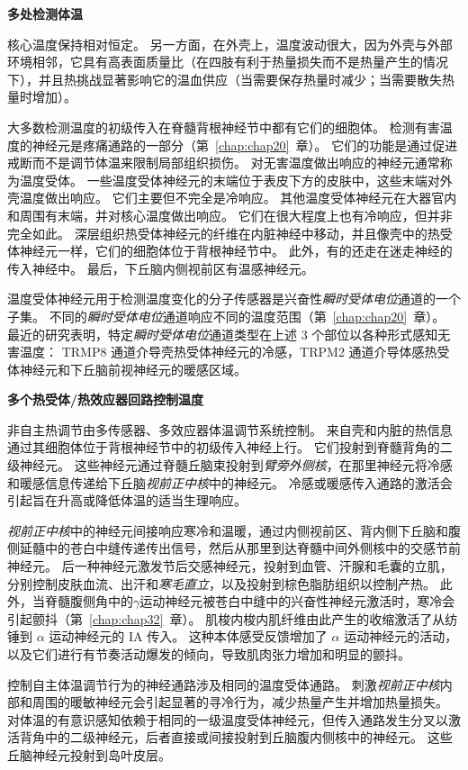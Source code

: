 \textbf{多处检测体温}

核心温度保持相对恒定。
另一方面，在外壳上，温度波动很大，因为外壳与外部环境相邻，它具有高表面质量比（在四肢有利于热量损失而不是热量产生的情况下），并且热挑战显著影响它的温血供应（当需要保存热量时减少；当需要散失热量时增加）。


大多数检测温度的初级传入在脊髓背根神经节中都有它们的细胞体。
检测有害温度的神经元是疼痛通路的一部分（第~\ref{chap:chap20}~章）。
它们的功能是通过促进戒断而不是调节体温来限制局部组织损伤。
对无害温度做出响应的神经元通常称为温度受体。
一些温度受体神经元的末端位于表皮下方的皮肤中，这些末端对外壳温度做出响应。
它们主要但不完全是冷响应。
其他温度受体神经元在大器官内和周围有末端，并对核心温度做出响应。
它们在很大程度上也有冷响应，但并非完全如此。
深层组织热受体神经元的纤维在内脏神经中移动，并且像壳中的热受体神经元一样，它们的细胞体位于背根神经节中。
此外，有的还走在迷走神经的传入神经中。
最后，下丘脑内侧视前区有温感神经元。


温度受体神经元用于检测温度变化的分子传感器是兴奋性\textit{瞬时受体电位}通道的一个子集。
不同的\textit{瞬时受体电位}通道响应不同的温度范围（第~\ref{chap:chap20}~章）。
最近的研究表明，特定\textit{瞬时受体电位}通道类型在上述 3 个部位以各种形式感知无害温度：
TRMP8 通道介导壳热受体神经元的冷感，TRPM2 通道介导体感热受体神经元和下丘脑前视神经元的暖感区域。


\textbf{多个热受体/热效应器回路控制温度}

非自主热调节由多传感器、多效应器体温调节系统控制。
来自壳和内脏的热信息通过其细胞体位于背根神经节中的初级传入神经上行。
它们投射到脊髓背角的二级神经元。
这些神经元通过脊髓丘脑束投射到\textit{臂旁外侧核}，在那里神经元将冷感和暖感信息传递给下丘脑\textit{视前正中核}中的神经元。
冷感或暖感传入通路的激活会引起旨在升高或降低体温的适当生理响应。


\textit{视前正中核}中的神经元间接响应寒冷和温暖，通过内侧视前区、背内侧下丘脑和腹侧延髓中的苍白中缝传递传出信号，然后从那里到达脊髓中间外侧核中的交感节前神经元。
后一种神经元激发节后交感神经元，投射到血管、汗腺和毛囊的立肌，分别控制皮肤血流、出汗和\textit{寒毛直立}，以及投射到棕色脂肪组织以控制产热。
此外，当脊髓腹侧角中的$\gamma$运动神经元被苍白中缝中的兴奋性神经元激活时，寒冷会引起颤抖（第~\ref{chap:chap32}~章）。
肌梭内梭内肌纤维由此产生的收缩激活了从纺锤到 $ \alpha $ 运动神经元的 IA 传入。
这种本体感受反馈增加了 $ \alpha $ 运动神经元的活动，以及它们进行有节奏活动爆发的倾向，导致肌肉张力增加和明显的颤抖。


控制自主体温调节行为的神经通路涉及相同的温度受体通路。
刺激\textit{视前正中核}内部和周围的暖敏神经元会引起显著的寻冷行为，减少热量产生并增加热量损失。
对体温的有意识感知依赖于相同的一级温度受体神经元，但传入通路发生分叉以激活背角中的二级神经元，后者直接或间接投射到丘脑腹内侧核中的神经元。
这些丘脑神经元投射到岛叶皮层。


